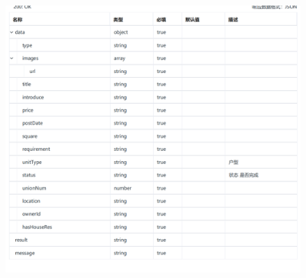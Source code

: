     \begin{figure}[h]
        \centering
        \includegraphics[height=19.0cm,width=14.0cm]{design/image/api37.png} 
        \end{figure}  
        \newpage
